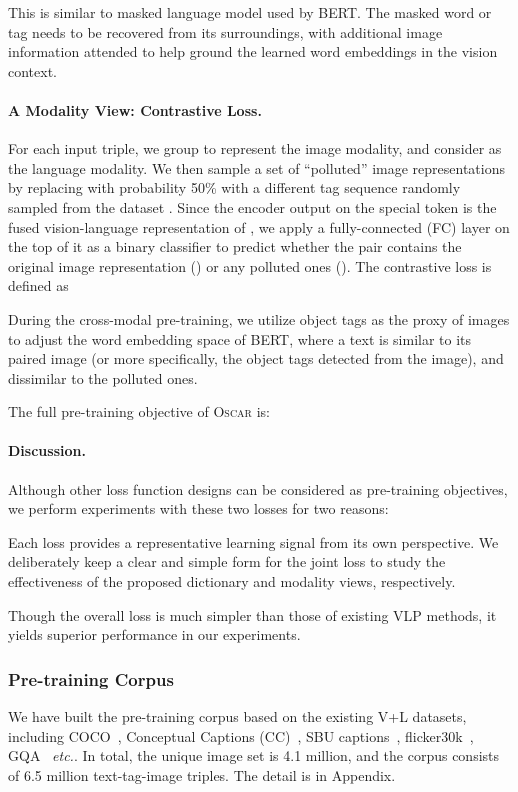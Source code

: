 \documentclass[runningheads]{llncs}
\newcommand{\etc}[0]{\emph{etc.}}
\newcommand{\short}{\textsc{Oscar}}
\begin{document}
This is similar to masked language model used by BERT. The masked word or tag needs to be recovered from its surroundings, with additional image information attended to help ground the learned word embeddings in the vision context.

\paragraph{A Modality View: Contrastive Loss.} 
For each input triple, we group  to represent the image modality, and consider  as the language modality. We then sample a set of ``polluted'' image representations by replacing  with probability 50\% with a different tag sequence randomly sampled from the dataset . Since the encoder output on the special token  is the fused vision-language representation of , we apply a fully-connected (FC) layer on the top of it as a binary classifier  to predict whether the pair contains the original image representation () or any polluted ones (). 
The contrastive loss is defined as


During the cross-modal pre-training, we utilize object tags as the proxy of images to adjust the word embedding space of BERT, where a text is similar to its paired image (or more specifically, the object tags detected from the image), and dissimilar to the polluted ones. 


The full pre-training objective of \short{} is: 



\paragraph{Discussion.} Although other loss function designs can be considered as pre-training objectives, we perform experiments with these two losses for two reasons: 
  
Each loss provides a representative learning signal from its own perspective. We deliberately keep a clear and simple form for the joint loss to study the effectiveness of the proposed dictionary and modality views, respectively.

Though the overall loss is much simpler than those of existing VLP methods, it yields superior performance in our experiments.


\subsubsection{Pre-training Corpus}
We have built the pre-training corpus based on the existing V+L datasets, including COCO~\cite{lin2014microsoft}, Conceptual Captions (CC)~\cite{sharma2018conceptual}, SBU captions~\cite{ordonez2011im2text}, flicker30k~\cite{young2014image}, GQA~\cite{hudson2019gqa} \etc. In total, the unique image set is 4.1 million, and the corpus consists of 6.5 million text-tag-image triples. The detail is in Appendix.
\end{document}

